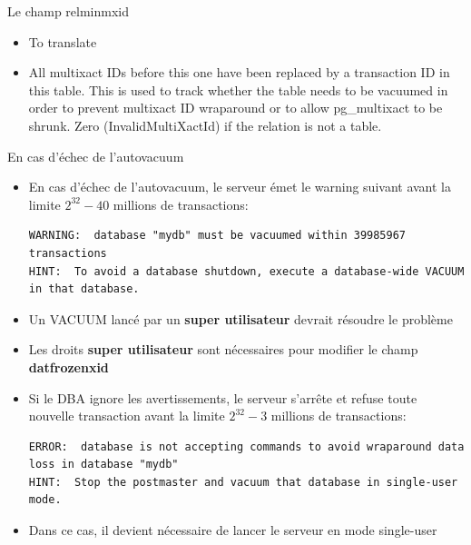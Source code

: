 
\begin{frame}{Le champ relminmxid}

\begin{itemize}
   \item To translate
   \item All multixact IDs before this one have been replaced by a transaction ID in this table. This is used to track whether the table needs to be vacuumed in order to prevent multixact ID wraparound or to allow pg\_multixact to be shrunk. Zero (InvalidMultiXactId) if the relation is not a table.
\end{itemize}

\begin{toile}
\end{toile}

\end{frame}


\begin{frame}[fragile]{En cas d'échec de l'autovacuum}

\begin{itemize}
   \item En cas d'échec de l'autovacuum, le serveur émet le warning suivant avant la limite $2^{32} - 40$ millions de transactions:
\begin{tiny}
\begin{Verbatim}[commandchars=\\\{\}]
WARNING:  database "mydb" must be vacuumed within 39985967 transactions
HINT:  To avoid a database shutdown, execute a database-wide VACUUM in that database.
\end{Verbatim}
\end{tiny}
   \item Un VACUUM lancé par un \textbf{super utilisateur} devrait résoudre le problème
   \item Les droits \textbf{super utilisateur} sont nécessaires pour modifier le champ \textbf{datfrozenxid}
   \item Si le DBA ignore les avertissements, le serveur s'arrête et refuse toute nouvelle transaction avant la limite $2^{32} - 3$ millions de transactions:
\begin{tiny}
\begin{Verbatim}[commandchars=\\\{\}]
ERROR:  database is not accepting commands to avoid wraparound data loss in database "mydb"
HINT:  Stop the postmaster and vacuum that database in single-user mode.
\end{Verbatim}
\end{tiny}
   \item Dans ce cas, il devient nécessaire de lancer le serveur en mode single-user
\end{itemize}

\end{frame}

